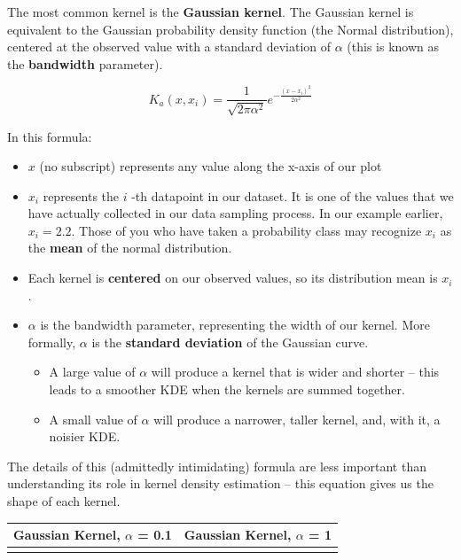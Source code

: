 \documentclass[
  letterpaper,
  DIV=11,
  numbers=noendperiod]{scrreprt}
\providecommand{\tightlist}{%
  \setlength{\itemsep}{0pt}\setlength{\parskip}{0pt}}\usepackage{longtable,booktabs,array}
\begin{document}
The most common kernel is the \textbf{Gaussian kernel}. The Gaussian
kernel is equivalent to the Gaussian probability density function (the
Normal distribution), centered at the observed value with a standard
deviation of \(\alpha\) (this is known as the \textbf{bandwidth}
parameter).

\[K_a(x, x_i) = \frac{1}{\sqrt{2\pi\alpha^{2}}}e^{-\frac{(x-x_i)^{2}}{2\alpha^{2}}}\]

In this formula:

\begin{itemize}
\tightlist
\item
  \(x\) (no subscript) represents any value along the x-axis of our plot
\item
  \(x_i\) represents the \(i\) -th datapoint in our dataset. It is one
  of the values that we have actually collected in our data sampling
  process. In our example earlier, \(x_i=2.2\). Those of you who have
  taken a probability class may recognize \(x_i\) as the \textbf{mean}
  of the normal distribution.
\item
  Each kernel is \textbf{centered} on our observed values, so its
  distribution mean is \(x_i\).
\item
  \(\alpha\) is the bandwidth parameter, representing the width of our
  kernel. More formally, \(\alpha\) is the \textbf{standard deviation}
  of the Gaussian curve.

  \begin{itemize}
  \tightlist
  \item
    A large value of \(\alpha\) will produce a kernel that is wider and
    shorter -- this leads to a smoother KDE when the kernels are summed
    together.
  \item
    A small value of \(\alpha\) will produce a narrower, taller kernel,
    and, with it, a noisier KDE.
  \end{itemize}
\end{itemize}

The details of this (admittedly intimidating) formula are less important
than understanding its role in kernel density estimation -- this
equation gives us the shape of each kernel.

\begin{longtable}[]{@{}
  >{\raggedright\arraybackslash}p{}
  >{\raggedright\arraybackslash}p{}@{}}
\toprule\noalign{}
\begin{minipage}[b]{\linewidth}\raggedright
Gaussian Kernel, \(\alpha\) = 0.1
\end{minipage} & \begin{minipage}[b]{\linewidth}\raggedright
Gaussian Kernel, \(\alpha\) = 1
\end{minipage} \\
\midrule\noalign{}
\endhead
\bottomrule\noalign{}
\endlastfoot
& \\
\end{longtable}
\end{document}
